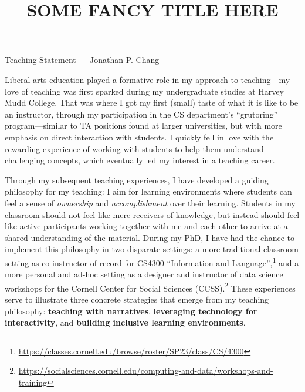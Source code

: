 \documentclass[12pt,letterpaper]{article}
\title{SOME FANCY TITLE HERE}
\begin{document}
\maketitle

{\centering Teaching Statement --- Jonathan P. Chang \par}

\vspace{0.5\baselineskip}
Liberal arts education played a formative role in my approach to teaching---my love of teaching was first sparked during my undergraduate studies at Harvey Mudd College.
That was where I got my first (small) taste of what it is like to be an instructor, through my participation in the CS department's ``grutoring'' program---similar to TA positions found at larger universities, but with more emphasis on direct interaction with students.
I quickly fell in love with the rewarding experience of working with students to help them understand challenging concepts, which eventually led my interest in a teaching career.

Through my subsequent teaching experiences, I have developed a guiding philosophy for my teaching: I aim for learning environments where students can feel a sense of \emph{ownership} and \emph{accomplishment} over their learning.
Students in my classroom should not feel like mere receivers of knowledge, but instead should feel like active participants working together with me and each other to arrive at a shared understanding of the material.
During my PhD, I have had the chance to implement this philosophy in two disparate settings: a more traditional classroom setting as co-instructor of record for CS4300 ``Information and Language'',\footnote{\url{https://classes.cornell.edu/browse/roster/SP23/class/CS/4300}} and a more personal and ad-hoc setting as a designer and instructor of data science workshops for the Cornell Center for Social Sciences (CCSS).\footnote{\url{https://socialsciences.cornell.edu/computing-and-data/workshops-and-training}}
These experiences serve to illustrate three concrete strategies that emerge from my teaching philosophy: \textbf{teaching with narratives}, \textbf{leveraging technology for interactivity}, and \textbf{building inclusive learning environments}.
\end{document}
